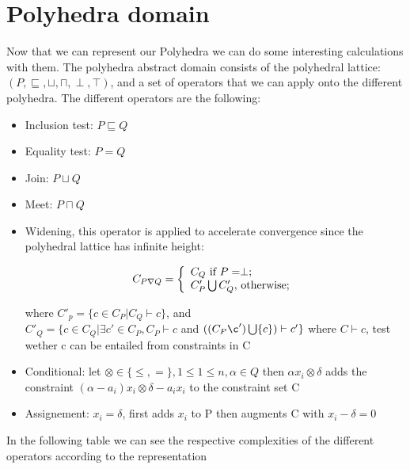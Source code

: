 \section{Polyhedra domain}

Now that we can represent our Polyhedra we can do some interesting calculations with them. The polyhedra abstract domain consists of the polyhedral lattice:
	$(P,\sqsubseteq,\sqcup,\sqcap,\perp,\top)$, and a set of operators that we can apply onto the different polyhedra. The different operators are the following:
	\begin{itemize}
		\item Inclusion test: $P \sqsubseteq Q$
		\item Equality test: $P=Q$
		\item Join: $P\sqcup Q$
		\item Meet: $P\sqcap Q$
		\item Widening, this operator is applied to accelerate convergence since the polyhedral lattice has infinite height:
		\begin{center}
		  \[
    C_{P\nabla Q}=\left\{
                \begin{array}{ll}
                  C_Q $ if $P=\perp ;\\
                  C'_P\bigcup C'_Q, $ otherwise$;
                \end{array}
              \right.
  	\]
		
		\end{center}
		where $C'_p=\{c\in C_P |C_Q \vdash c \}$, and\\  $C'_Q=\{c\in C_Q |\exists c' \in C_P,C_P \vdash c $ and $((C_P\c')\bigcup \{c\})\vdash c' \}$
		where $C\vdash c$, test wether c can be entailed from constraints in C
		\item Conditional: let $\otimes \in \{\leq,=\},1\leq 1\leq n,\alpha \in Q$ then $\alpha x_i \otimes \delta$ adds the constraint $(\alpha-a_i)x_i \otimes\delta - a_i x_i$ to the constraint set C
		\item Assignement: $x_i = \delta$, first adds $x_i$ to P then augments C with $x_i -\delta = 0$
		
	\end{itemize}
	 In the following table we can see the respective complexities of the different operators according to the representation
	 
